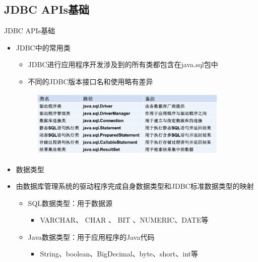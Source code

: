\subsection{JDBC APIs基础}
\begin{frame}{JDBC APIs基础}
\begin{itemize}
    \item JDBC中的常用类
    \begin{itemize}
        \item JDBC进行应用程序开发涉及到的所有类都包含在java.sql包中
        \item 不同的JDBC版本接口名和使用略有差异
    \end{itemize}
    \begin{figure}
        \centering
        \includegraphics[width=0.9\textwidth]{figure/fig-11.jpg}
    \end{figure}
    \framebreak
    \item 数据类型
    \item 由数据库管理系统的驱动程序完成自身数据类型和JDBC标准数据类型的映射
    \begin{itemize}
        \item SQL数据类型：用于数据源
        \begin{itemize}
            \item VARCHAR、 CHAR 、 BIT 、NUMERIC、DATE等
        \end{itemize}
        \item Java数据类型：用于应用程序的Java代码
        \begin{itemize}
            \item String、boolean、BigDecimal、byte、short、int等
        \end{itemize}
    \end{itemize}
    
\end{itemize}
    \begin{table}[!htp]
        \centering
        \caption{SQL数据类型和java数据类型之间的转换规则}
        \label{tab:my_label}
    \end{table}
\end{frame}
